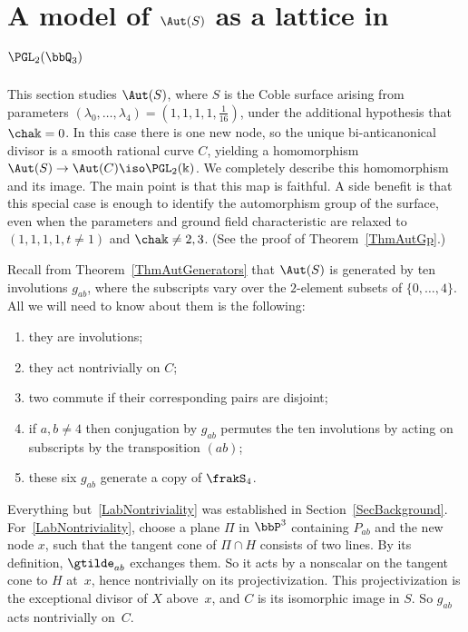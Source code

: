\section{A model of \texorpdfstring{$\Aut(S)$}{Aut(S)} as a lattice in \texorpdfstring{$\PGL_2(\bbQ_3)$}{PGL2(Q3)}}\label{SecLattice}

This section studies $\Aut(S)$, where $S$ is the Coble surface arising from parameters $(\lambda_0,\dots,\lambda_4)=(1,1,1,1,\frac1{16})$, under the additional hypothesis that $\cha\Bbbk=0$. In this case there is one new node, so the unique bi-anticanonical divisor is a smooth rational curve $C$, yielding a homomorphism $\Aut(S)\to\Aut(C)\iso\PGL_2(\Bbbk)$. We completely describe this homomorphism and its image. The main point is that this map is faithful. A side benefit is that this special case is enough to identify the automorphism group of the surface, even when the parameters and ground field characteristic are relaxed to $(1,1,1,1,t\neq1)$ and $\cha\Bbbk\neq2,3$. (See the proof of Theorem~\ref{ThmAutGp}.)

Recall from Theorem~\ref{ThmAutGenerators} that $\Aut(S)$ is generated by ten involutions $g_{ab}$, where the subscripts vary over the $2$-element subsets of $\{0,\dots,4\}$. All we will need to know about them is the following:
\begin{enumerate}
\item \label{list5.1}they are involutions;
\item \label{LabNontriviality}
they act nontrivially on $C$;
\item \label{list5.3}two commute if their corresponding pairs are disjoint;
\item \label{list5.4}if $a,b\neq4$ then conjugation by $g_{ab}$ permutes the ten involutions by acting on subscripts by the transposition $(ab)$;
\item \label{list5.5}these six $g_{ab}$ generate a copy of $\frakS_4$.
\end{enumerate}
Everything but~\eqref{LabNontriviality} was established in Section~\ref{SecBackground}. For~\eqref{LabNontriviality}, choose a plane $\Pi$ in $\bbP^3$ containing $P_{ab}$ and the new node $x$, such that the tangent cone of $\Pi\cap H$ consists of two lines. By its definition, $\gtilde_{ab}$ exchanges them. So it acts by a nonscalar on the tangent cone to $H$ at~$x$, hence nontrivially on its projectivization. This projectivization is the exceptional divisor of $X$ above~$x$, and $C$ is its isomorphic image in $S$. So $g_{ab}$ acts nontrivially on~$C$.


